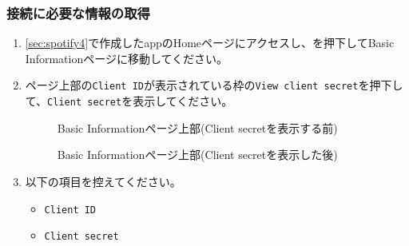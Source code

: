         \subsubsection{接続に必要な情報の取得}
        \label{sec:spotify5}
            \begin{enumerate}
                \item \ref{sec:spotify4}で作成したappのHomeページにアクセスし、を押下してBasic Informationページに移動してください。
                \label{item:spotify10}

                \item ページ上部の\texttt{Client ID}が表示されている枠の\texttt{View client secret}を押下して、\texttt{Client secret}を表示してください。
                \label{item:spotify11}
                    \begin{figure}[htbp]
                        \centering
                        \caption{Basic Informationページ上部(Client secretを表示する前)}
                        \label{img:spotify8}
                    \end{figure}
                    \begin{figure}[htbp]
                        \centering
                        \caption{Basic Informationページ上部(Client secretを表示した後)}
                        \label{img:spotify9}
                    \end{figure}

                \item 以下の項目を控えてください。
                \label{item:spotify12}
                    \begin{itemize}
                        \item \texttt{Client ID}
                        \item \texttt{Client secret}
                    \end{itemize}
            \end{enumerate}

